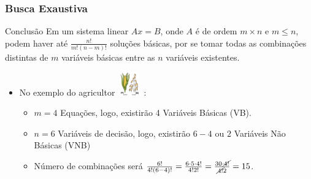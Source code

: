 \begin{frame}
	\frametitle{Busca Exaustiva}
	\begin{alertblock}{Conclusão}
		Em um sistema linear $Ax = B$, onde $A$ é de ordem $m \times n$ e $m \le n$, podem haver até $\frac{n!}{m!(n-m)!}$ soluções básicas, por se tomar todas as combinações distintas de $m$ variáveis básicas entre as $n$ variáveis existentes. 
	\end{alertblock}
	{
	\begin{itemize}
	\item[] No exemplo do agricultor \hspace{0.3cm} \includegraphics[width=1cm,height=1cm]{milho_aveia2.png} :
		\begin{itemize}
		\item $m=4$ Equações, logo, existirão 4 Variáveis Básicas (VB).
		\item $n=6$ Variáveis de decisão, logo, existirão $6-4$ ou $2$ Variáveis Não Básicas (VNB)
		\item Número de combinações será 
		$\frac{6!}{4!(6-4)!}=\frac{6 \cdot5 \cdot 4!}{4!2!}=\frac{30 \cdot \cancel{4!}}{\cancel{4!}2}=15$.
		\end{itemize}
	\end{itemize}
	}
\end{frame}
